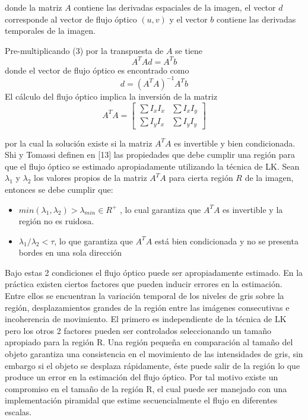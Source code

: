 donde la matriz $A$ contiene las derivadas espaciales de la imagen, el vector $d$ corresponde al vector de flujo óptico $(u,v)$ y el vector $b$ contiene las derivadas temporales de la imagen.

Pre-multiplicando (3) por la transpuesta de $A$ se tiene
\begin{equation}
  A^T A d =A^T b
\end{equation}
donde el vector de flujo óptico es encontrado como 
\begin{equation}
  d= (A^T A)^{-1} A^T b
\end{equation}
El cálculo del flujo óptico implica la inversión de la matriz 
\begin{equation}
  A^TA=
  \begin{bmatrix}
    \sum I_x I_x  & \sum I_x I_y \\
    \sum I_y I_x  & \sum I_y I_y      
  \end{bmatrix}
\end{equation}

por la cual la solución existe si la matriz $A^TA$ es invertible y bien condicionada. Shi y Tomassi definen en [13] las propiedades que debe cumplir una región para que el flujo óptico se estimado apropiadamente utilizando la técnica de LK. Sean $\lambda_1$ y $\lambda_2$ los valores propios de la matriz  $A^TA$ para cierta región $R$ de la imagen, entonces se debe cumplir que:
\begin{itemize}
\item $min(\lambda_1 , \lambda_2) > \lambda_{min} \in R^+$ , lo cual garantiza que $A^TA$ es invertible y la región no es ruidosa.
\item $\lambda_1 /\lambda_2 < \tau$, lo que garantiza que $A^TA$ está bien condicionada y no se presenta bordes en una sola dirección
\end{itemize}

Bajo estas 2 condiciones el flujo óptico puede ser apropiadamente estimado. En la práctica existen ciertos factores que pueden inducir errores en la estimación. Entre ellos se encuentran la variación temporal de los niveles de gris sobre la región, desplazamientos grandes de la región entre las imágenes consecutivas e incoherencia de movimiento. El primero es independiente de la técnica de LK pero los otros 2 factores pueden ser controlados seleccionando un tamaño apropiado para la región R. Una región pequeña en comparación al tamaño del objeto garantiza una consistencia en el movimiento de las intensidades de gris, sin embargo si el objeto se desplaza rápidamente, éste puede salir de la región lo que produce un error en la estimación del flujo óptico. Por tal motivo existe un compromiso en el tamaño de la región R, el cual puede ser manejado con una implementación piramidal que estime secuencialmente el flujo en diferentes escalas.

